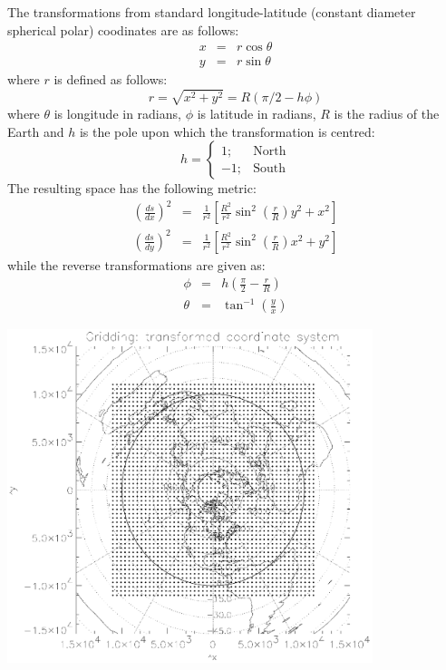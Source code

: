 The transformations from standard longitude-latitude 
(constant diameter spherical polar) coodinates are as follows:
\begin{eqnarray}
x & = & r \cos \theta \\
y & = & r \sin \theta
\end{eqnarray}
where $r$ is defined as follows:
\begin{equation}
r = \sqrt{x^2 + y^2} = R (\pi/2 - h \phi)
\end{equation}
where $\theta$ is longitude in radians,
$\phi$ is latitude in radians,
$R$ is the radius of the Earth
and $h$ is the pole upon which the transformation is centred:
\begin{equation}
h = \left \lbrace \begin{array}{rl} 1; & \mathrm{North} \\ -1; & \mathrm{South} \end{array} \right .
\end{equation}
The resulting space has the following metric:
\begin{eqnarray}
\left (\frac{ds}{d x} \right )^2 & = & \frac{1}{r^2} \left [
	\frac{R^2}{r^2} \sin^2 \left (\frac{r}{R} \right ) 
	y^2 + x^2 \right ] \\
\left (\frac{ds}{d y} \right )^2 & = & \frac{1}{r^2} \left [
	\frac{R^2}{r^2} \sin^2 \left (\frac{r}{R} \right )
	x^2 + y^2 \right ]
\end{eqnarray}
while the reverse transformations are given as:
\begin{eqnarray}
\phi & = & h \left ( \frac{\pi}{2} - \frac{r}{R} \right ) \\
\theta & = & \tan^{-1} \left (\frac{y}{x} \right )
\end{eqnarray}

\begin{center}
\includegraphics[width=0.8\textwidth]{grid_example.ps}
\end{center}

